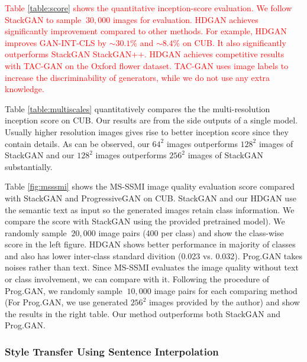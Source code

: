 \documentclass[10pt,twocolumn,letterpaper]{article}
\begin{document}


\textcolor{red}{Table \ref{table:score} shows the quantitative inception-score evaluation. We follow StackGAN to sample ${~}30,000$ images for evaluation.
HDGAN achieves significantly improvement compared to other methods. For example, HDGAN improves GAN-INT-CLS by ${\sim}30.1\%$  and ${\sim}8.4\%$ on CUB. It also significantly outperforms StackGAN StackGAN++.
HDGAN achieves competitive results with TAC-GAN on the Oxford flower dataset. TAC-GAN uses image labels to increase the discriminability of generators, while we do not use any extra knowledge.}


Table \ref{table:multiscales} quantitatively compares the the multi-resolution inception score on CUB. Our results are from the side outputs of a single model. Usually higher resolution images gives rise to better inception score since they contain details. As can be observed, our $64^2$ images outperforms $128^2$ images of StackGAN and our $128^2$ images outperforms $256^2$ images of StackGAN substantially. 

Table \ref{fig:msssmi} shows the MS-SSMI image quality evaluation score compared with StackGAN and ProgressiveGAN on CUB. StackGAN and our HDGAN use the semantic text as input so the generated images retain class information. We compare the score with StackGAN using the provided pretrained model). We randomly sample ${~}20,000$ image pairs (400 per class) and show the class-wise score in the left figure. HDGAN shows better performance in majority of classes and also has lower inter-class standard divition (0.023 vs. 0.032).
Prog.GAN takes noises rather than text. Since MS-SSMI evaluates the image quality without text or class involvement, we can compare with it. Following the procedure of Prog.GAN, we randomly sample ${~}10,000$ image pairs for each comparing method (For Prog.GAN, we use generated $256^2$ images provided by the author) and show the results in the right table. Our method outperforms both StackGAN and Prog.GAN. 



\subsubsection{Style Transfer Using Sentence Interpolation}
\end{document}
